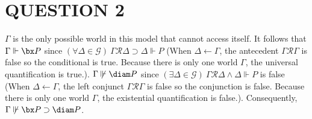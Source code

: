 \section*{QUESTION 2}

\begin{center}
\end{center}
$\Gamma$ is the only possible world in this model that cannot access itself. It follows that $\Gamma \Vdash \bx P$ since $(\forall \Delta \in \mathcal{G})\ \Gamma\mathcal{R}\Delta \supset \Delta \Vdash P$ (When $\Delta \gets \Gamma$, the antecedent $\Gamma\mathcal{R}\Gamma$ is false so the conditional is true. Because there is only one world $\Gamma$, the universal quantification is true.). $\Gamma \not\Vdash \diam P$ since $(\exists \Delta \in \mathcal{G})\ \Gamma\mathcal{R}\Delta \land \Delta \Vdash P$ is false (When $\Delta \gets \Gamma$, the left conjunct $\Gamma\mathcal{R}\Gamma$ is false so the conjunction is false. Because there is only one world $\Gamma$, the existential quantification is false.). Consequently, $\Gamma \not\Vdash \bx P \supset \diam P$.